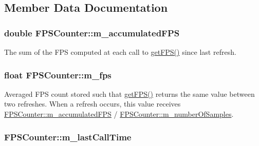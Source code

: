 \subsection{Member Data Documentation}
\hypertarget{classFPSCounter_a73c8cd4484bc8d851854f438aca5a2d4}{
\subsubsection[{m\+\_\+accumulated\+F\+P\+S}]{\setlength{\rightskip}{0pt plus 5cm}double F\+P\+S\+Counter\+::m\+\_\+accumulated\+F\+P\+S\hspace{0.3cm}{\ttfamily [private]}}}\label{classFPSCounter_a73c8cd4484bc8d851854f438aca5a2d4}
The sum of the F\+P\+S computed at each call to \hyperlink{classFPSCounter_a2b7e118b610867e4f62b359eb589e65f}{get\+F\+P\+S()} since last refresh. \hypertarget{classFPSCounter_a29bfe52f7ae0f66958aab30e268e95ed}{
\subsubsection[{m\+\_\+fps}]{\setlength{\rightskip}{0pt plus 5cm}float F\+P\+S\+Counter\+::m\+\_\+fps\hspace{0.3cm}{\ttfamily [private]}}}\label{classFPSCounter_a29bfe52f7ae0f66958aab30e268e95ed}
Averaged F\+P\+S count stored such that \hyperlink{classFPSCounter_a2b7e118b610867e4f62b359eb589e65f}{get\+F\+P\+S()} returns the same value between two refreshes. When a refresh occurs, this value receives \hyperlink{classFPSCounter_a73c8cd4484bc8d851854f438aca5a2d4}{F\+P\+S\+Counter\+::m\+\_\+accumulated\+F\+P\+S} / \hyperlink{classFPSCounter_af985f96020619ec9c94dc1d059f4512d}{F\+P\+S\+Counter\+::m\+\_\+number\+Of\+Samples}. \hypertarget{classFPSCounter_a2571dd4fcfa2e6adeeca59088a3481cf}{
\subsubsection[{m\+\_\+last\+Call\+Time}]{ F\+P\+S\+Counter\+::m\+\_\+last\+Call\+Time\hspace{0.3cm}{\ttfamily [private]}}}\label{classFPSCounter_a2571dd4fcfa2e6adeeca59088a3481cf}

